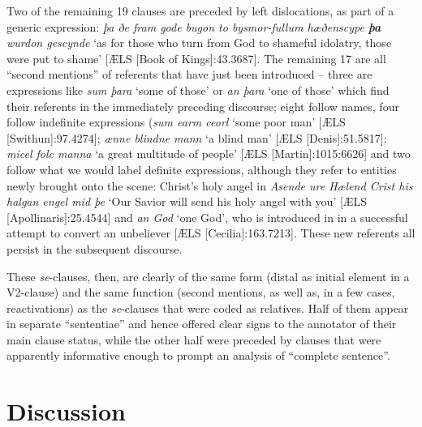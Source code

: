 \documentclass[output=paper,colorlinks,citecolor=brown]{langscibook}
\begin{document}
Two of the remaining 19 clauses are preceded by left dislocations, as part of a  generic expression: \textit{þa ðe fram gode bugon to bysmor-fullum hæðenscype} \textbf{\textit{þa}} \textit{wurdon gescynde} ‘as for those who turn from God to shameful idolatry, those were put to shame' [ÆLS [Book of Kings]:43.3687]. The remaining 17 are all “second mentions” of referents that have just been introduced – three are expressions like \textit{sum þara} ‘some of those' or \textit{an þara} ‘one of those' which find their referents in the immediately preceding discourse; eight follow names, four follow indefinite expressions (\textit{sum earm ceorl} ‘some poor man' [ÆLS [Swithun]:97.4274]; \textit{ænne blindne mann} ‘a blind man' [ÆLS [Denis]:51.5817]; \textit{micel folc manna} ‘a great multitude of people' [ÆLS [Martin]:1015:6626] and two follow what we would label definite expressions, although they refer to entities newly brought onto the scene: Christ's holy angel in \textit{Asende ure Hælend Crist his halgan engel mid þe} ‘Our Savior will send his holy angel with you' [ÆLS [Apollinaris]:25.4544] and \textit{an God} ‘one God', who is introduced in  in a successful attempt to convert an unbeliever [ÆLS [Cecilia]:163.7213]. These new referents all persist in the subsequent discourse.

These \textit{se}{}-clauses, then, are clearly of the same form (distal  as initial element in a V2-clause) and the same function (second mentions, as well as, in a few cases, reactivations) as the \textit{se}{}-clauses that were coded as relatives. Half of them appear in separate “sententiae” and hence offered clear signs to the annotator of their main clause status, while the other half were preceded by clauses that were apparently informative enough to prompt an analysis of “complete sentence”. 


\section{Discussion}\label{sec:los:6}
\end{document}

